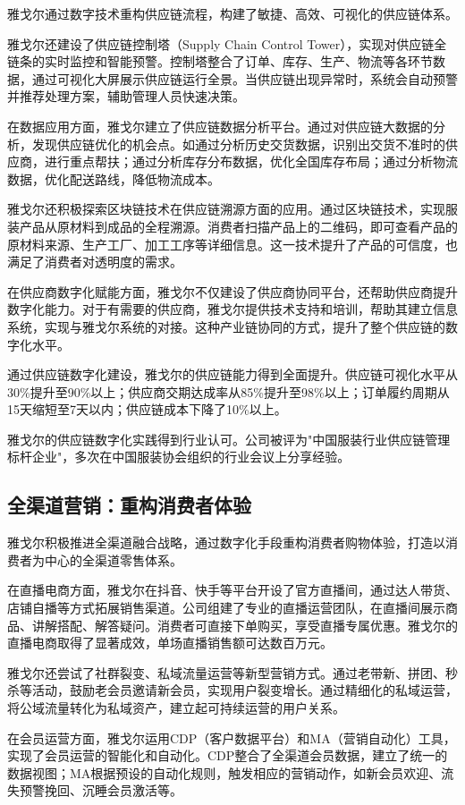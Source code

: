 \documentclass[12pt,a4paper]{article}
\begin{document}
雅戈尔通过数字技术重构供应链流程，构建了敏捷、高效、可视化的供应链体系。

雅戈尔还建设了供应链控制塔（Supply Chain Control Tower），实现对供应链全链条的实时监控和智能预警。控制塔整合了订单、库存、生产、物流等各环节数据，通过可视化大屏展示供应链运行全景。当供应链出现异常时，系统会自动预警并推荐处理方案，辅助管理人员快速决策。

在数据应用方面，雅戈尔建立了供应链数据分析平台。通过对供应链大数据的分析，发现供应链优化的机会点。如通过分析历史交货数据，识别出交货不准时的供应商，进行重点帮扶；通过分析库存分布数据，优化全国库存布局；通过分析物流数据，优化配送路线，降低物流成本。

雅戈尔还积极探索区块链技术在供应链溯源方面的应用。通过区块链技术，实现服装产品从原材料到成品的全程溯源。消费者扫描产品上的二维码，即可查看产品的原材料来源、生产工厂、加工工序等详细信息。这一技术提升了产品的可信度，也满足了消费者对透明度的需求。

在供应商数字化赋能方面，雅戈尔不仅建设了供应商协同平台，还帮助供应商提升数字化能力。对于有需要的供应商，雅戈尔提供技术支持和培训，帮助其建立信息系统，实现与雅戈尔系统的对接。这种产业链协同的方式，提升了整个供应链的数字化水平。

通过供应链数字化建设，雅戈尔的供应链能力得到全面提升。供应链可视化水平从30\%提升至90\%以上；供应商交期达成率从85\%提升至98\%以上；订单履约周期从15天缩短至7天以内；供应链成本下降了10\%以上。

雅戈尔的供应链数字化实践得到行业认可。公司被评为"中国服装行业供应链管理标杆企业"，多次在中国服装协会组织的行业会议上分享经验。

\subsection{全渠道营销：重构消费者体验}

雅戈尔积极推进全渠道融合战略，通过数字化手段重构消费者购物体验，打造以消费者为中心的全渠道零售体系。

在直播电商方面，雅戈尔在抖音、快手等平台开设了官方直播间，通过达人带货、店铺自播等方式拓展销售渠道。公司组建了专业的直播运营团队，在直播间展示商品、讲解搭配、解答疑问。消费者可直接下单购买，享受直播专属优惠。雅戈尔的直播电商取得了显著成效，单场直播销售额可达数百万元。

雅戈尔还尝试了社群裂变、私域流量运营等新型营销方式。通过老带新、拼团、秒杀等活动，鼓励老会员邀请新会员，实现用户裂变增长。通过精细化的私域运营，将公域流量转化为私域资产，建立起可持续运营的用户关系。

在会员运营方面，雅戈尔运用CDP（客户数据平台）和MA（营销自动化）工具，实现了会员运营的智能化和自动化。CDP整合了全渠道会员数据，建立了统一的数据视图；MA根据预设的自动化规则，触发相应的营销动作，如新会员欢迎、流失预警挽回、沉睡会员激活等。
\end{document}
